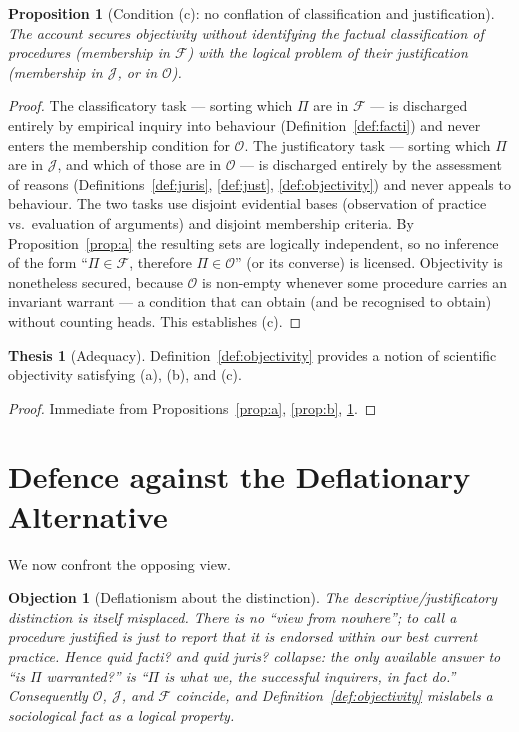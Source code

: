 \documentclass{amsart}
\theoremstyle{definition}
\newtheorem{thesis}{Thesis}
\theoremstyle{plain}
\newtheorem{proposition}{Proposition}
\newtheorem{objection}{Objection}
\begin{document}
\begin{proposition}[Condition (c): no conflation of classification and
justification]\label{prop:c}
The account secures objectivity without identifying the factual classification
of procedures (membership in $\mathcal{F}$) with the logical problem of their
justification (membership in $\mathcal{J}$, or in $\mathcal{O}$).
\end{proposition}

\begin{proof}
The classificatory task --- sorting which $\Pi$ are in $\mathcal{F}$ --- is
discharged entirely by empirical inquiry into behaviour
(Definition~\ref{def:facti}) and never enters the membership condition for
$\mathcal{O}$. The justificatory task --- sorting which $\Pi$ are in
$\mathcal{J}$, and which of those are in $\mathcal{O}$ --- is discharged
entirely by the assessment of reasons (Definitions~\ref{def:juris},
\ref{def:just}, \ref{def:objectivity}) and never appeals to behaviour. The two
tasks use disjoint evidential bases (observation of practice vs.\ evaluation of
arguments) and disjoint membership criteria. By
Proposition~\ref{prop:a} the resulting sets are logically independent, so no
inference of the form ``$\Pi\in\mathcal{F}$, therefore $\Pi\in\mathcal{O}$''
(or its converse) is licensed. Objectivity is nonetheless secured, because
$\mathcal{O}$ is non-empty whenever some procedure carries an invariant
warrant --- a condition that can obtain (and be recognised to obtain) without
counting heads. This establishes (c).
\end{proof}

\begin{thesis}[Adequacy]\label{thesis:adequacy}
Definition~\ref{def:objectivity} provides a notion of scientific objectivity
satisfying (a), (b), and (c).
\end{thesis}

\begin{proof}
Immediate from Propositions~\ref{prop:a}, \ref{prop:b}, \ref{prop:c}.
\end{proof}

\section{Defence against the Deflationary Alternative}

We now confront the opposing view.

\begin{objection}[Deflationism about the distinction]\label{obj:deflation}
The descriptive/justificatory distinction is itself misplaced. There is no
``view from nowhere''; to call a procedure justified is just to report that it
is endorsed within our best current practice. Hence quid facti? and quid
juris? collapse: the only available answer to ``is $\Pi$ warranted?'' is
``$\Pi$ is what we, the successful inquirers, in fact do.'' Consequently
$\mathcal{O}$, $\mathcal{J}$, and $\mathcal{F}$ coincide, and
Definition~\ref{def:objectivity} mislabels a sociological fact as a logical
property.
\end{objection}
\end{document}
